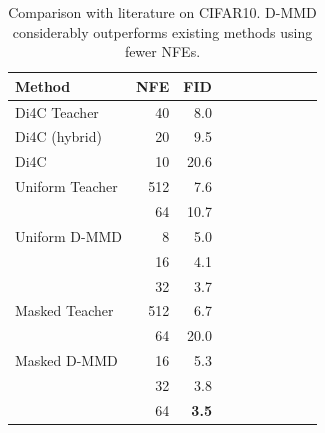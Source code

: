 \begin{table}[t]
    \centering
    \begin{tabular}{l|rrrrrrrrr}
        \toprule
         \bfseries Method & NFE & FID \\\midrule
         Di4C Teacher & 40 & 8.0 \\
         Di4C (hybrid) & 20 & 9.5 \\
         Di4C & 10 & 20.6 \\
         \midrule
        Uniform Teacher & 512 & 7.6 \\
         & 64 & 10.7 \\
        Uniform D-MMD & 8 & 5.0 \\
        & 16 & 4.1 \\
        & 32 & 3.7 \\ \midrule
        Masked Teacher & 512 & 6.7 \\
         & 64 & 20.0 \\
        Masked D-MMD & 16 & 5.3 & \\
        & 32 & 3.8 & \\
        & 64 & \textbf{3.5} \\
        \bottomrule
    \end{tabular}
    \caption{Comparison with literature on CIFAR10. D-MMD considerably outperforms existing methods using fewer NFEs.}
    \label{tab:cifar10_related}
\end{table}


